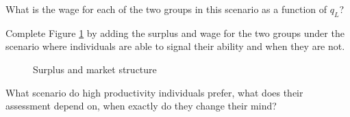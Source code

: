 \begin{boenumerate}
\item What is the wage for each of the two groups in this scenario as a function of $q_L$?

\item  Complete Figure \ref{Canvas Market Structure} by adding the surplus and wage for the two groups under the scenario where individuals are able to signal their ability and when they are not.

\begin{figure}[h]\centering
\caption{Surplus and market structure}\label{Canvas Market Structure}
\end{figure}

\item What scenario do high productivity individuals prefer, what does their assessment depend on, when exactly do they change their mind?

\end{boenumerate}
